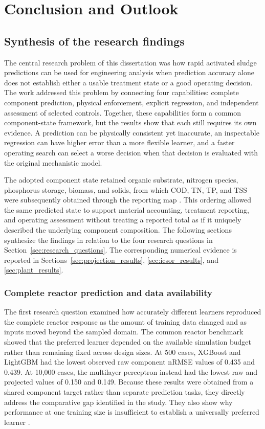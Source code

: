 \chapter{Conclusion and Outlook}
\label{ch:conclusion}

\section{Synthesis of the research findings}
\label{sec:assessment_observed_findings}

The central research problem of this dissertation was how rapid activated sludge predictions can be used for engineering analysis when prediction accuracy alone does not establish either a usable treatment state or a good operating decision. The work addressed this problem by connecting four capabilities: complete component prediction, physical enforcement, explicit regression, and independent assessment of selected controls. Together, these capabilities form a common component-state framework, but the results show that each still requires its own evidence. A prediction can be physically consistent yet inaccurate, an inspectable regression can have higher error than a more flexible learner, and a faster operating search can select a worse decision when that decision is evaluated with the original mechanistic model.

The adopted component state retained organic substrate, nitrogen species, phosphorus storage, biomass, and solids, from which COD, TN, TP, and TSS were subsequently obtained through the reporting map \citep{Henze2006}. This ordering allowed the same predicted state to support material accounting, treatment reporting, and operating assessment without treating a reported total as if it uniquely described the underlying component composition. The following sections synthesize the findings in relation to the four research questions in Section~\ref{sec:research_questions}. The corresponding numerical evidence is reported in Sections~\ref{sec:projection_results}, \ref{sec:icsor_results}, and \ref{sec:plant_results}.

\subsection{Complete reactor prediction and data availability}

The first research question examined how accurately different learners reproduced the complete reactor response as the amount of training data changed and as inputs moved beyond the sampled domain. The common reactor benchmark showed that the preferred learner depended on the available simulation budget rather than remaining fixed across design sizes. At 500 cases, XGBoost and LightGBM had the lowest observed raw component nRMSE values of 0.435 and 0.439. At 10,000 cases, the multilayer perceptron instead had the lowest raw and projected values of 0.150 and 0.149. Because these results were obtained from a shared component target rather than separate prediction tasks, they directly address the comparative gap identified in the study. They also show why performance at one training size is insufficient to establish a universally preferred learner \citep{VieringLoog2023,Borisov2024}.

